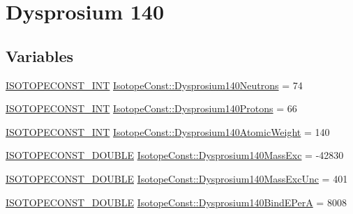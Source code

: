 \hypertarget{group___isotope_const-_dysprosium-_dy140}{}\section{Dysprosium 140}
\label{group___isotope_const-_dysprosium-_dy140}
\subsection*{Variables}
\begin{DoxyCompactItemize}
\item 
\mbox{\hyperlink{group___isotope_const-_macros_ga5f18360b3e99483a35c32d789e62621c}{I\+S\+O\+T\+O\+P\+E\+C\+O\+N\+S\+T\+\_\+\+I\+NT}} \mbox{\hyperlink{group___isotope_const-_dysprosium-_dy140_gade2b53e36362949b3e98ca96929c4d63}{Isotope\+Const\+::\+Dysprosium140\+Neutrons}} = 74
\item 
\mbox{\hyperlink{group___isotope_const-_macros_ga5f18360b3e99483a35c32d789e62621c}{I\+S\+O\+T\+O\+P\+E\+C\+O\+N\+S\+T\+\_\+\+I\+NT}} \mbox{\hyperlink{group___isotope_const-_dysprosium-_dy140_gaae258190e58a4f8bfafb60b02de7dd8f}{Isotope\+Const\+::\+Dysprosium140\+Protons}} = 66
\item 
\mbox{\hyperlink{group___isotope_const-_macros_ga5f18360b3e99483a35c32d789e62621c}{I\+S\+O\+T\+O\+P\+E\+C\+O\+N\+S\+T\+\_\+\+I\+NT}} \mbox{\hyperlink{group___isotope_const-_dysprosium-_dy140_gab449594aa884a538a62602fe1f650a30}{Isotope\+Const\+::\+Dysprosium140\+Atomic\+Weight}} = 140
\item 
\mbox{\hyperlink{group___isotope_const-_macros_ga8f45a7272ce02c0b4c65c44636ed719a}{I\+S\+O\+T\+O\+P\+E\+C\+O\+N\+S\+T\+\_\+\+D\+O\+U\+B\+LE}} \mbox{\hyperlink{group___isotope_const-_dysprosium-_dy140_ga943e8000246e4b8196fad32450a17651}{Isotope\+Const\+::\+Dysprosium140\+Mass\+Exc}} = -\/42830
\item 
\mbox{\hyperlink{group___isotope_const-_macros_ga8f45a7272ce02c0b4c65c44636ed719a}{I\+S\+O\+T\+O\+P\+E\+C\+O\+N\+S\+T\+\_\+\+D\+O\+U\+B\+LE}} \mbox{\hyperlink{group___isotope_const-_dysprosium-_dy140_gafab83a6c28feb0c62f828334e67e5e27}{Isotope\+Const\+::\+Dysprosium140\+Mass\+Exc\+Unc}} = 401
\item 
\mbox{\hyperlink{group___isotope_const-_macros_ga8f45a7272ce02c0b4c65c44636ed719a}{I\+S\+O\+T\+O\+P\+E\+C\+O\+N\+S\+T\+\_\+\+D\+O\+U\+B\+LE}} \mbox{\hyperlink{group___isotope_const-_dysprosium-_dy140_gacca1438714392be0ce3b4a20dca22a8d}{Isotope\+Const\+::\+Dysprosium140\+Bind\+E\+PerA}} = 8008
\item 

\end{DoxyCompactItemize}
